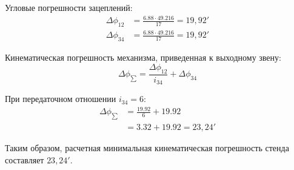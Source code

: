 Угловые погрешности зацеплений:
\begin{align*}
\Delta \phi_{12} &= \frac{6.88 \cdot 49.216}{17} = 19,\!92' \\
\Delta \phi_{34} &= \frac{6.88 \cdot 49.216}{17} = 19,\!92'
\end{align*}

Кинематическая погрешность механизма, приведенная к выходному звену:
\begin{equation}
\Delta \phi_{\sum} = \frac{\Delta \phi_{12}}{i_{34}} + \Delta \phi_{34}
\end{equation}

\noindent При передаточном отношении $i_{34} = 6$:
\begin{align*}
\Delta \phi_{\sum} &= \frac{19.92}{6} + 19.92 \\
&= 3.32 + 19.92 = 23,\!24'
\end{align*}

Таким образом, расчетная минимальная кинематическая погрешность стенда составляет $23,24'$.





